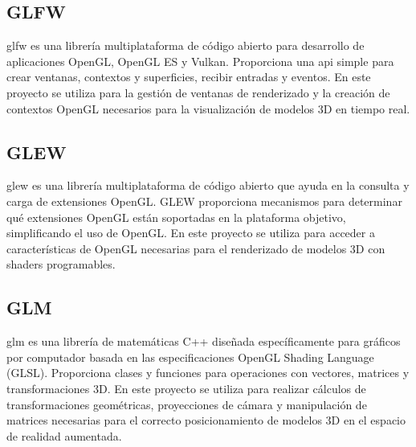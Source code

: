 \subsection{GLFW}
\acrfull{glfw} es una librería multiplataforma de código abierto para desarrollo de aplicaciones OpenGL, OpenGL ES y Vulkan. Proporciona una \acrshort{api} simple para crear ventanas, contextos y superficies, recibir entradas y eventos. En este proyecto se utiliza para la gestión de ventanas de renderizado y la creación de contextos OpenGL necesarios para la visualización de modelos 3D en tiempo real.

\subsection{GLEW}
\acrfull{glew} es una librería multiplataforma de código abierto que ayuda en la consulta y carga de extensiones OpenGL. GLEW proporciona mecanismos para determinar qué extensiones OpenGL están soportadas en la plataforma objetivo, simplificando el uso de OpenGL. En este proyecto se utiliza para acceder a características de OpenGL necesarias para el renderizado de modelos 3D con shaders programables.

\subsection{GLM}
\acrfull{glm} es una librería de matemáticas C++ diseñada específicamente para gráficos por computador basada en las especificaciones OpenGL Shading Language (GLSL). Proporciona clases y funciones para operaciones con vectores, matrices y transformaciones 3D. En este proyecto se utiliza para realizar cálculos de transformaciones geométricas, proyecciones de cámara y manipulación de matrices necesarias para el correcto posicionamiento de modelos 3D en el espacio de realidad aumentada.

